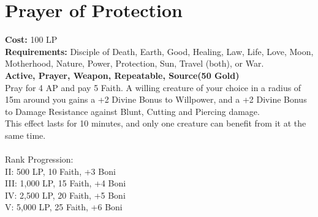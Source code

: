 \section{Prayer of Protection}\label{prayer:protection}
\textbf{Cost:} 100 LP\\
\textbf{Requirements:} Disciple of Death, Earth, Good, Healing, Law, Life, Love, Moon, Motherhood, Nature, Power, Protection, Sun, Travel (both), or War. \\
\textbf{Active, Prayer, Weapon, Repeatable, Source(50 Gold)}\\
Pray for 4 AP and pay 5 Faith.
A willing creature of your choice in a radius of 15m around you gains a +2 Divine Bonus to Willpower, and a +2 Divine Bonus to Damage Resistance against Blunt, Cutting and Piercing damage.\\
This effect lasts for 10 minutes, and only one creature can benefit from it at the same time.\\
\\
Rank Progression:\\
II: 500 LP, 10 Faith, +3 Boni\\
III: 1,000 LP, 15 Faith, +4 Boni\\
IV: 2,500 LP, 20 Faith, +5 Boni\\
V: 5,000 LP, 25 Faith, +6 Boni\\
